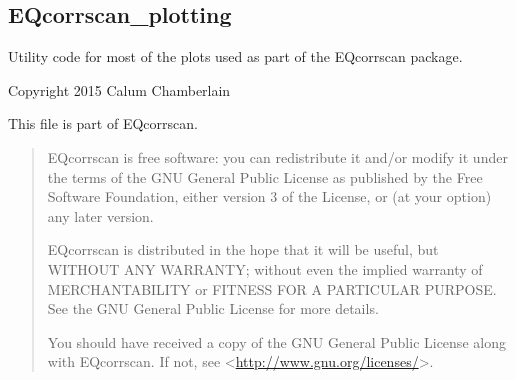 \documentclass[a4paper,10pt,english]{sphinxmanual}
\begin{document}
\subsection{EQcorrscan\_plotting}
\label{submodules/utils.EQcorrscan_plotting:module-EQcorrscan_plotting}\label{submodules/utils.EQcorrscan_plotting::doc}\label{submodules/utils.EQcorrscan_plotting:eqcorrscan-plotting}
Utility code for most of the plots used as part of the EQcorrscan package.

Copyright 2015 Calum Chamberlain

This file is part of EQcorrscan.
\begin{quote}

EQcorrscan is free software: you can redistribute it and/or modify
it under the terms of the GNU General Public License as published by
the Free Software Foundation, either version 3 of the License, or
(at your option) any later version.

EQcorrscan is distributed in the hope that it will be useful,
but WITHOUT ANY WARRANTY; without even the implied warranty of
MERCHANTABILITY or FITNESS FOR A PARTICULAR PURPOSE.  See the
GNU General Public License for more details.

You should have received a copy of the GNU General Public License
along with EQcorrscan.  If not, see \textless{}\href{http://www.gnu.org/licenses/}{http://www.gnu.org/licenses/}\textgreater{}.
\end{quote}
\end{document}
